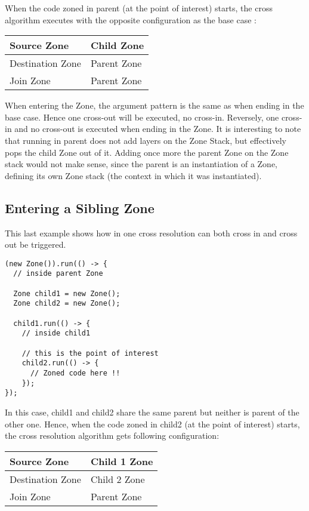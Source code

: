 When the code zoned in parent (at the point of interest) starts, the cross algorithm executes with the opposite configuration as the base case :

\begin{tabular}{| l | l |}
\hline
Source Zone & Child Zone \\ \hline
Destination Zone & Parent Zone \\ \hline
Join Zone & Parent Zone \\ \hline
\end{tabular}

When entering the Zone, the argument pattern is the same as when ending in the base case. Hence one cross-out will be executed, no cross-in. Reversely, one cross-in and no cross-out is executed when ending in the Zone.
It is interesting to note that running in parent does not add layers on the Zone Stack, but effectively pops the child Zone out of it. Adding once more the parent Zone on the Zone stack would not make sense, since the parent is an instantiation of a Zone, defining its own Zone stack (the context in which it was instantiated).


\subsection*{Entering a Sibling Zone}

This last example shows how in one cross resolution can both cross in and cross out be triggered.

\begin{lstlisting}
(new Zone()).run(() -> {
  // inside parent Zone

  Zone child1 = new Zone();
  Zone child2 = new Zone();

  child1.run(() -> {
    // inside child1
    
    // this is the point of interest
    child2.run(() -> {
      // Zoned code here !!
    });
});
\end{lstlisting}

In this case, child1 and child2 share the same parent but neither is parent of the other one. Hence, when the code zoned in child2 (at the point of interest) starts, the cross resolution algorithm gets following configuration:

\begin{tabular}{| l | l |}
\hline
Source Zone & Child 1 Zone \\ \hline
Destination Zone & Child 2 Zone \\ \hline
Join Zone & Parent Zone \\ \hline
\end{tabular}

